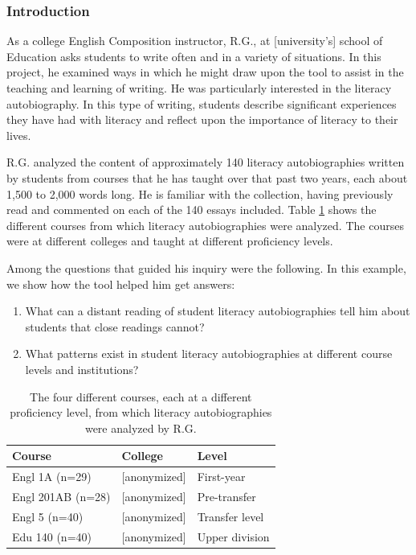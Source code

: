 \documentclass{sig-alternate}
\begin{document}
\subsubsection{Introduction}
As a college English Composition instructor,  R.G., at  [university's] school of Education asks students to write often and in a variety of situations. In this project, he examined ways in which he might draw upon the tool to assist in the teaching and learning of writing. He was particularly interested in the literacy autobiography. In this type of writing, students describe significant experiences they have had with literacy and reflect upon the importance of literacy to their lives.  

R.G. analyzed the content of approximately 140 literacy autobiographies written by students from courses that he has taught over that past two years, each about 1,500 to 2,000 words long. He is familiar with the collection, having previously read and commented on each of the 140 essays included.  Table \ref{table:rex-courses} shows the different courses from which literacy autobiographies were analyzed. The courses were at different colleges and taught at different proficiency levels.

Among the questions that guided his inquiry were the following. In this example, we show how the tool helped him get answers:
\begin{enumerate}
\item What can a distant reading of student literacy autobiographies tell him about students that close readings cannot?
\item What patterns exist in student literacy autobiographies at different course levels and institutions?
\end{enumerate}


\begin{table}
\begin{tabular}{lll}
Course& College & Level \\
\hline
Engl 1A (n=29) & [anonymized] & First-year \\
Engl 201AB (n=28) & [anonymized] & Pre-transfer \\
Engl 5 (n=40) & [anonymized] & Transfer level \\
Edu 140 (n=40) & [anonymized] & Upper division \\
\end{tabular}
\caption{The four different courses, each at a different proficiency level, from which literacy autobiographies were analyzed by R.G. \label{table:rex-courses}}
\end{table}
\end{document}
